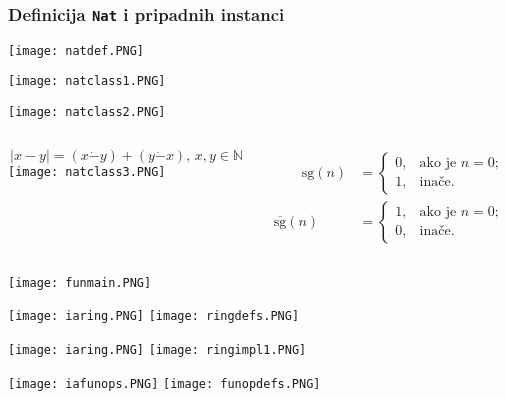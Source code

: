 \documentclass{beamer}
\def\N{\mathbb{N}}
\begin{document}
\begin{frame}
\frametitle{Definicija \texttt{Nat} i pripadnih instanci}
\texttt{[image: natdef.PNG]}
\end{frame}
\begin{frame}
\texttt{[image: natclass1.PNG]}
\end{frame}
\begin{frame}
\texttt{[image: natclass2.PNG]}
\end{frame}
\begin{frame}
\begin{columns}
    \begin{column}{0.5\textwidth}
    \begin{equation*}
        |x-y|=(x\dot{-}y)+(y\dot{-}x),\,x,y\in\N
    \end{equation*}
    \texttt{[image: natclass3.PNG]}
\end{column}
\begin{column}{0.6\textwidth}
    \begin{align*}
        \qquad\mathrm{sg}(n)&=\begin{cases}
            0,&\text{ako je $n=0$;}\\
            1,&\text{inače.}
        \end{cases} \\
        \overline{\mathrm{sg}}(n)&=\begin{cases}
            1,&\text{ako je $n=0$;}\\
            0,&\text{inače.}
        \end{cases}
    \end{align*}
\end{column}
\end{columns}
\end{frame}
\begin{frame}
    \texttt{[image: funmain.PNG]}
\end{frame}
\begin{frame}
    \texttt{[image: iaring.PNG]}
    \texttt{[image: ringdefs.PNG]}
\end{frame}
\begin{frame}
    \texttt{[image: iaring.PNG]}
    \texttt{[image: ringimpl1.PNG]}
\end{frame}
\begin{frame}
\texttt{[image: iafunops.PNG]}
\texttt{[image: funopdefs.PNG]}%
\end{frame}
\end{document}

